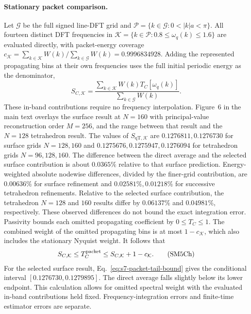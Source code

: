 \documentclass[10pt,aps,onecolumn,notitlepage,nofootinbib]{revtex4-2}
\newcommand{\qT}{\mathrm{qT}}
\begin{document}
\paragraph*{Stationary packet comparison.}
Let $\mathcal G$ be the full signed line-DFT grid and $\mathcal P=\{k\in\mathcal G:0<|k|a<\pi\}$. All fourteen distinct DFT frequencies in $\mathcal K=\{k\in\mathcal P:0.8\le\omega_q(k)\le1.6\}$ are evaluated directly, with packet-energy coverage $c_{\mathcal K}=\sum_{k\in\mathcal K}W(k)/\sum_{k\in\mathcal G}W(k)=0.9996834928$. Adding the represented propagating bins at their own frequencies uses the full initial periodic energy as the denominator,
\[
 S_{C,\mathcal K}=
 \frac{\sum_{k\in\mathcal K}W(k)T_C[\omega_q(k)]}{\sum_{k\in\mathcal G}W(k)}.
\]
These in-band contributions require no frequency interpolation. Figure~6 in the main text overlays the surface result at $N=160$ with principal-value reconstruction order $M=256$, and the range between that result and the $N=128$ tetrahedron result. The values of $S_{\qT,\mathcal K}$ are $0.1276811,0.1276730$ for surface grids $N=128,160$ and $0.1275676,0.1275947,0.1276094$ for tetrahedron grids $N=96,128,160$. The difference between the direct average and the selected surface contribution is about $0.0365\%$ relative to that surface prediction. Energy-weighted absolute nodewise differences, divided by the finer-grid contribution, are $0.00636\%$ for surface refinement and $0.02581\%,0.01218\%$ for successive tetrahedron refinements. Relative to the selected surface contribution, the tetrahedron $N=128$ and $160$ results differ by $0.06137\%$ and $0.04981\%$, respectively. These observed differences do not bound the exact integration error. Passivity bounds each omitted propagating coefficient by $0\le T_C\le1$. The combined weight of the omitted propagating bins is at most $1-c_{\mathcal K}$, which also includes the stationary Nyquist weight. It follows that
\begin{equation*}
 S_{C,\mathcal K}\le T_C^{\rm packet}\le S_{C,\mathcal K}+1-c_{\mathcal K}.
 \tag{SM5Ch}\label{eq:s7-packet-tail-bound}
\end{equation*}
For the selected surface result, Eq.~\eqref{eq:s7-packet-tail-bound} gives the conditional interval $[0.1276730,0.1279895]$. The direct average falls slightly below its lower endpoint. This calculation allows for omitted spectral weight with the evaluated in-band contributions held fixed. Frequency-integration errors and finite-time estimator errors are separate.
\end{document}
